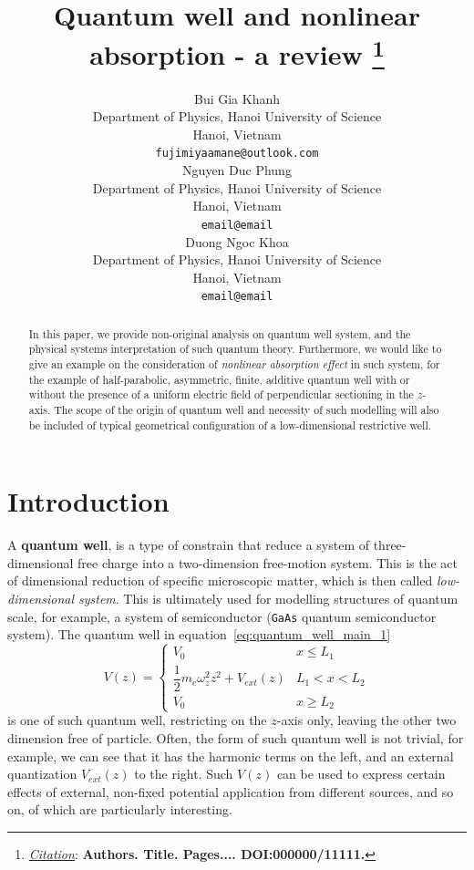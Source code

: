 \documentclass{article}
\title{Quantum well and nonlinear absorption - a review
\thanks{\textit{\underline{Citation}}: 
\textbf{Authors. Title. Pages.... DOI:000000/11111.}} 
}
\author{
  Bui Gia Khanh\\
  Department of Physics, Hanoi University of Science \\
  Hanoi, Vietnam\\
  \texttt{fujimiyaamane@outlook.com} \\
   \AND
  Nguyen Duc Phung \\
   Department of Physics, Hanoi University of Science \\
  Hanoi, Vietnam\\
  \texttt{email@email} \\
  \And 
  Duong Ngoc Khoa \\
   Department of Physics, Hanoi University of Science \\
  Hanoi, Vietnam \\
  \texttt{email@email} 
}
\begin{document}
\maketitle

\begin{abstract}
    In this paper, we provide non-original analysis on quantum well system, and the physical systems interpretation of such quantum theory. Furthermore, we would like to give an example on the consideration of \textit{nonlinear absorption effect} in such system, for the example of half-parabolic, asymmetric, finite, additive quantum well with or without the presence of a uniform electric field of perpendicular sectioning in the $z$-axis. The scope of the origin of quantum well and necessity of such modelling will also be included of typical geometrical configuration of a low-dimensional restrictive well. 
\end{abstract}

\section{Introduction}

A \textbf{quantum well}, is a type of constrain that reduce a system of three-dimensional free charge into a two-dimension free-motion system. This is the act of dimensional reduction of specific microscopic matter, which is then called \textit{low-dimensional system}. This is ultimately used for modelling structures of quantum scale, for example, a system of semiconductor (\texttt{GaAs} quantum semiconductor system). The quantum well in equation~\ref{eq:quantum_well_main_1} 
\begin{equation}\label{eq:quantum_well_main_1}
    V(z)=\begin{cases}
        V_{0} & x \leq L_{1} \\
        \dfrac{1}{2}m_{{e}}\omega_{z}^{2}z^{2}+  V_{ext}(z) & L_{1} < x < L_{2}\\
        V_{0} & x \geq L_{2}
    \end{cases}
\end{equation}
is one of such quantum well, restricting on the $z$-axis only, leaving the other two dimension free of particle. Often, the form of such quantum well is not trivial, for example, we can see that it has the harmonic terms on the left, and an external quantization $V_{ext}(z)$ to the right. Such $V(z)$ can be used to express certain effects of external, non-fixed potential application from different sources, and so on, of which are particularly interesting. 
\end{document}
